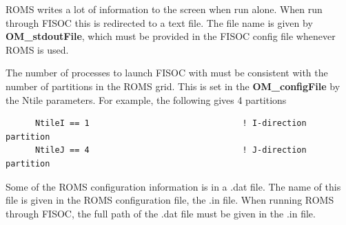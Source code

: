 \documentclass[11pt]{article}
\begin{document}
ROMS writes a lot of information to the screen when run alone.  
When run through FISOC this is redirected to a text file. 
The file name is given by \textbf{OM\_stdoutFile}, 
which must be provided in the FISOC config file 
whenever ROMS is used.

The number of processes to launch FISOC with must be consistent with the number of 
partitions in the ROMS grid.  This is set in the \textbf{OM\_configFile} by the 
Ntile parameters.  For example, the following gives 4 partitions
\begin{lstlisting}
      NtileI == 1                               ! I-direction partition
      NtileJ == 4                               ! J-direction partition
\end{lstlisting}

Some of the ROMS configuration information is in a .dat file.
The name of this file is given in the ROMS configuration file, the .in file.
When running ROMS through FISOC, the full path of the .dat file must be 
given in the .in file.


\end{document}
